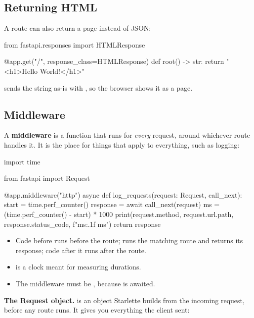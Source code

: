 \subsection{Returning HTML}

A route can also return a page instead of JSON:

\begin{py}
from fastapi.responses import HTMLResponse


@app.get("/", response_class=HTMLResponse)
def root() -> str:
	return "<h1>Hello World!</h1>"
\end{py}

 sends the string as-is with , so the browser shows it as a page.

\subsection{Middleware}

A \textbf{middleware} is a function that runs for \emph{every} request, around whichever route handles it. It is the place for things that apply to everything, such as logging:

\begin{py}
import time

from fastapi import Request


@app.middleware("http")
async def log_requests(request: Request, call_next):
	start = time.perf_counter()
	response = await call_next(request)
	ms = (time.perf_counter() - start) * 1000
	print(request.method, request.url.path, response.status_code, f"{ms:.1f} ms")
	return response
\end{py}

\begin{itemize}
\item Code before  runs before the route;  runs the matching route and returns its response; code after it runs after the route.
\item {} is a clock meant for measuring durations.
\item The middleware must be , because  is awaited.
\end{itemize}

\textbf{The Request object.}  is an object Starlette builds from the incoming request, before any route runs. It gives you everything the client sent:

